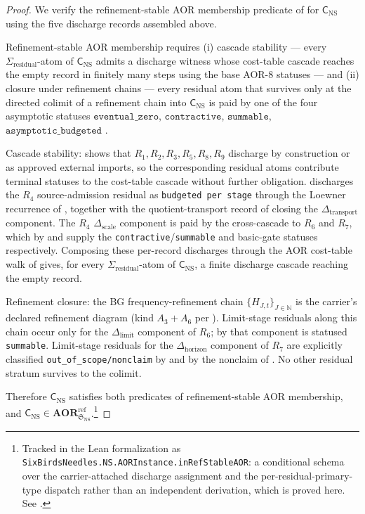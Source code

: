 \documentclass[11pt]{article}
\theoremstyle{definition}
\begin{document}
\begin{proof}
We verify the refinement-stable AOR membership predicate of
\citet{Tsiokos2026AOR} for \(\mathsf C_{\mathrm{NS}}\) using
the five discharge records assembled above.

Refinement-stable AOR membership requires (i) cascade
stability --- every \(\Sigma_{\mathrm{residual}}\)-atom of \(\mathsf C_{\mathrm{NS}}\)
admits a discharge witness whose cost-table cascade reaches the
empty record in finitely many steps using the base AOR-8
statuses --- and (ii) closure under refinement chains --- every
residual atom that survives only at the directed colimit of a
refinement chain into \(\mathsf C_{\mathrm{NS}}\) is paid by
one of the four asymptotic statuses
\(\texttt{eventual\_zero}\), \(\texttt{contractive}\),
\(\texttt{summable}\), \(\texttt{asymptotic\_budgeted}\)
\citep{Tsiokos2026AOR}.

Cascade stability: 
shows that \(R_1,R_2,R_3,R_5,R_8,R_9\) discharge by
construction or as approved external imports, so the
corresponding residual atoms contribute terminal statuses to
the cost-table cascade without further obligation.
 discharges the \(R_4\)
source-admission residual as \texttt{budgeted per stage}
through the Loewner recurrence of
, together with the
quotient-transport record of
 closing the
\(\Delta_{\mathrm{transport}}\) component.  The \(R_4\)
\(\Delta_{\mathrm{scale}}\) component is paid by the
cross-cascade to \(R_6\) and \(R_7\), which by
 and
 supply the
\texttt{contractive}/\texttt{summable} and basic-gate
statuses respectively.  Composing these per-record discharges
through the AOR cost-table walk of \citet{Tsiokos2026AOR}
gives, for every \(\Sigma_{\mathrm{residual}}\)-atom of \(\mathsf C_{\mathrm{NS}}\),
a finite discharge cascade reaching the empty record.

Refinement closure: the BG frequency-refinement chain
\(\{H_{J,t}\}_{J\in\mathbb N}\) is the carrier's declared
refinement diagram (kind \(A_3+A_6\) per
).  Limit-stage residuals
along this chain occur only for the
\(\Delta_{\mathrm{limit}}\) component of \(R_6\); by
 that component is statused
\texttt{summable}.  Limit-stage residuals for the
\(\Delta_{\mathrm{horizon}}\) component of \(R_7\) are
explicitly classified \texttt{out\_of\_scope/nonclaim} by
 and by the nonclaim of
.  No other
residual stratum survives to the colimit.

Therefore \(\mathsf C_{\mathrm{NS}}\) satisfies both
predicates of refinement-stable AOR membership, and
\(\mathsf C_{\mathrm{NS}}\in
\mathbf{AOR}^{\mathrm{ref}}_{\mathfrak S_{\mathrm{NS}}}\).\footnote{Tracked in the Lean formalization as
\texttt{SixBirdsNeedles.NS.AORInstance.inRefStableAOR}: a
conditional schema over the carrier-attached discharge
assignment and the per-residual-primary-type dispatch rather
than an independent derivation, which is proved here.  See
.}
\end{proof}
\end{document}
